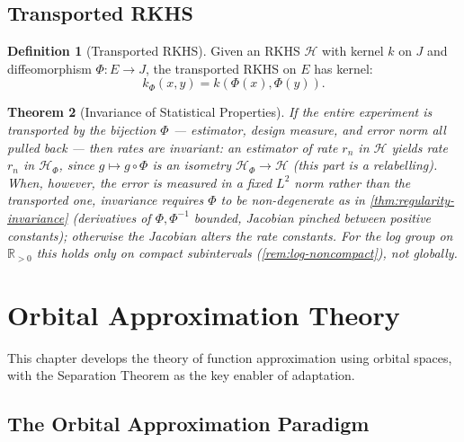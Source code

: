 \documentclass[11pt,twoside,openright]{book}
\theoremstyle{plain}
\newtheorem{theorem}{Theorem}[chapter]
\theoremstyle{definition}
\newtheorem{definition}[theorem]{Definition}
\theoremstyle{remark}
\newcommand{\calH}{\mathcal{H}}
\newcommand{\Rd}{\mathbb{R}}
\begin{document}
\section{Transported RKHS}

\begin{definition}[Transported RKHS]
Given an RKHS $\calH$ with kernel $k$ on $J$ and diffeomorphism $\Phi : E \to J$, the transported RKHS on $E$ has kernel:
\begin{equation}
k_\Phi(x, y) = k(\Phi(x), \Phi(y)).
\label{eq:transported-kernel}
\end{equation}
\end{definition}

\begin{theorem}[Invariance of Statistical Properties]
\label{thm:rkhs-invariance}
If the \emph{entire} experiment is transported by the bijection $\Phi$ --- estimator, design measure, and error norm all pulled back --- then rates are invariant: an estimator of rate $r_n$ in $\calH$ yields rate $r_n$ in $\calH_\Phi$, since $g\mapsto g\circ\Phi$ is an isometry $\calH_\Phi\to\calH$ (this part is a relabelling). When, however, the error is measured in a \emph{fixed} $L^2$ norm rather than the transported one, invariance requires $\Phi$ to be non-degenerate as in \cref{thm:regularity-invariance} (derivatives of $\Phi,\Phi^{-1}$ bounded, Jacobian pinched between positive constants); otherwise the Jacobian alters the rate constants. For the log group on $\Rd_{>0}$ this holds only on compact subintervals (\cref{rem:log-noncompact}), not globally.
\end{theorem}


\chapter{Orbital Approximation Theory}
\label{ch:approximation}

This chapter develops the theory of function approximation using orbital spaces, with the Separation Theorem as the key enabler of adaptation.

\section{The Orbital Approximation Paradigm}
\end{document}
